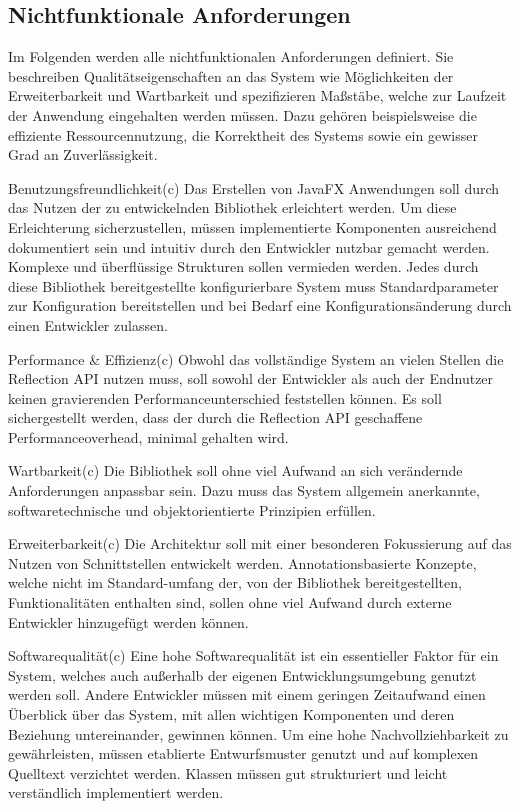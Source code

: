 \subsection{Nichtfunktionale Anforderungen}
\label{anforderungsanalyse_nichtfunktional}
Im Folgenden werden alle nichtfunktionalen Anforderungen definiert. Sie beschreiben Qualitätseigenschaften an das System wie Möglichkeiten der Erweiterbarkeit und Wartbarkeit und spezifizieren Maßstäbe, welche zur Laufzeit der Anwendung eingehalten werden müssen. Dazu gehören beispielsweise die effiziente Ressourcennutzung, die Korrektheit des Systems sowie ein gewisser Grad an Zuverlässigkeit.
\begin{nreq}{Benutzungsfreundlichkeit}(c)
	Das Erstellen von JavaFX Anwendungen soll durch das Nutzen der zu entwickelnden Bibliothek erleichtert werden. Um diese Erleichterung sicherzustellen, müssen implementierte Komponenten ausreichend dokumentiert sein und intuitiv durch den Entwickler nutzbar gemacht werden. Komplexe und überflüssige Strukturen sollen vermieden werden. Jedes durch diese Bibliothek bereitgestellte konfigurierbare System muss Standardparameter zur Konfiguration bereitstellen und bei Bedarf eine Konfigurationsänderung durch einen Entwickler zulassen.
\end{nreq}
\begin{nreq}{Performance \& Effizienz}(c)
	Obwohl das vollständige System an vielen Stellen die Reflection API nutzen muss, soll sowohl der Entwickler als auch der Endnutzer keinen gravierenden Performanceunterschied feststellen können. Es soll sichergestellt werden, dass der durch die Reflection API geschaffene Performanceoverhead, minimal gehalten wird.
\end{nreq}
\begin{nreq}{Wartbarkeit}(c)
	Die Bibliothek soll ohne viel Aufwand an sich verändernde Anforderungen anpassbar sein. Dazu muss das System allgemein anerkannte, softwaretechnische und objektorientierte Prinzipien erfüllen.
\end{nreq}
\begin{nreq}{Erweiterbarkeit}(c)
	Die Architektur soll mit einer besonderen Fokussierung auf das Nutzen von Schnittstellen entwickelt werden. Annotationsbasierte Konzepte, welche nicht im Standard-umfang der, von der Bibliothek bereitgestellten, Funktionalitäten enthalten sind, sollen ohne viel Aufwand durch externe Entwickler hinzugefügt werden können.
\end{nreq}
\begin{nreq}{Softwarequalität}(c)
	Eine hohe Softwarequalität ist ein essentieller Faktor für ein System, welches auch außerhalb der eigenen Entwicklungsumgebung genutzt werden soll. Andere Entwickler müssen mit einem geringen Zeitaufwand einen Überblick über das System, mit allen wichtigen Komponenten und deren Beziehung untereinander, gewinnen können. Um eine hohe Nachvollziehbarkeit zu gewährleisten, müssen etablierte Entwurfsmuster genutzt und auf komplexen Quelltext verzichtet werden. Klassen müssen gut strukturiert und leicht verständlich implementiert werden.
\end{nreq}
